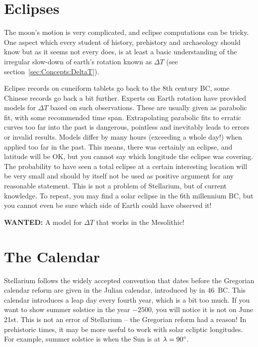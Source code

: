 \section{Eclipses}
\label{sec:Accuracy:Eclipses}

The moon's motion is very complicated, and eclipse computations can be
tricky.  One aspect which every student of history, prehistory and
archaeology should know but as it seems not every does, is at least a
basic understanding of the irregular slow-down of earth's rotation
known as $\Delta T$ (see section~\ref{sec:Concepts:DeltaT}).

Eclipse records on cuneiform tablets go back to the 8th century BC, some Chinese 
records go back a bit further. Experts on Earth rotation have provided models 
for $\Delta T$ based on such observations. These are usually given as parabolic fit, 
with some recommended time span. Extrapolating parabolic fits to erratic curves too far into the past is dangerous, 
pointless and inevitably leads to errors or invalid results. Models differ by many hours (exceeding a whole day!)
when applied too far in the past. This means, there was certainly an eclipse, and latitude will be OK, 
but you cannot say which longitude the eclipse was covering. The probability to have seen a total 
eclipse at a certain interesting location will be very small and should by itself not be used as positive argument 
for any reasonable statement. This is not a problem of Stellarium, 
but of current knowledge. To repeat, you may find a solar eclipse in the 6th millennium BC, 
but you cannot even be sure which side of Earth could have observed it!

\textbf{WANTED:} A model for $\Delta T$ that works in the Mesolithic! 

\section{The Calendar}
\label{sec:Accuracy:Calendar}

Stellarium follows the widely accepted convention that dates before the Gregorian calendar 
reform are given in the Julian calendar, introduced by  in 46~BC. 
This calendar introduces a leap day every fourth year, which is a bit too much. 
If you want to show summer solstice in the year $-2500$, you will notice it is not on June 21st. 
This is not an error of Stellarium -- the Gregorian reform had a reason! In prehistoric times, 
it may be more useful to work with solar ecliptic longitudes. For example, summer solstice is
when the Sun is at $\lambda=90\degree$.

